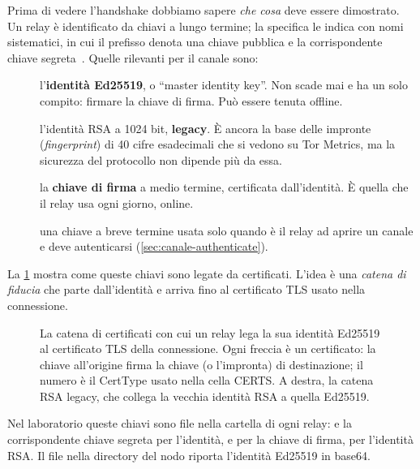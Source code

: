 Prima di vedere l'handshake dobbiamo sapere \emph{che cosa} deve essere dimostrato. Un relay è identificato da chiavi a lungo termine; la specifica le indica con nomi sistematici, in cui il prefisso  denota una chiave pubblica e  la corrispondente chiave segreta~. Quelle rilevanti per il canale sono:

\begin{description}
  \item[] l'\textbf{identità Ed25519}, o \enquote{master identity key}. Non scade mai e ha un solo compito: firmare la chiave di firma. Può essere tenuta offline.
  \item[] l'identità RSA a 1024 bit, \textbf{legacy}. È ancora la base delle impronte (\emph{fingerprint}) di 40 cifre esadecimali che si vedono su Tor Metrics, ma la sicurezza del protocollo non dipende più da essa.
  \item[] la \textbf{chiave di firma} a medio termine, certificata dall'identità. È quella che il relay usa ogni giorno, online.
  \item[] una chiave a breve termine usata solo quando è il relay ad aprire un canale e deve autenticarsi (\cref{sec:canale-authenticate}).
\end{description}

La \cref{fig:chiavi-relay} mostra come queste chiavi sono legate da certificati. L'idea è una \emph{catena di fiducia} che parte dall'identità e arriva fino al certificato TLS usato nella connessione.

\begin{figure}[htbp]
\centering

\caption{La catena di certificati con cui un relay lega la sua identità Ed25519 al certificato TLS della connessione. Ogni freccia è un certificato: la chiave all'origine firma la chiave (o l'impronta) di destinazione; il numero è il CertType usato nella cella CERTS. A destra, la catena RSA legacy, che collega la vecchia identità RSA a quella Ed25519.}
\label{fig:chiavi-relay}
\end{figure}

Nel laboratorio queste chiavi sono file nella cartella  di ogni relay:  e la corrispondente chiave segreta per l'identità,  e  per la chiave di firma,  per l'identità RSA. Il file  nella directory del nodo riporta l'identità Ed25519 in base64.

